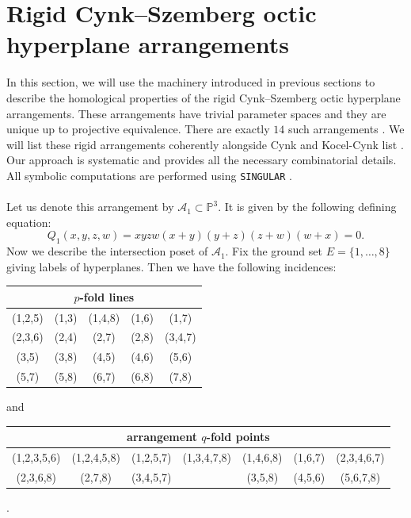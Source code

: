 \documentclass[11pt]{article}
\theoremstyle{plain}
\theoremstyle{definition}
\begin{document}
\section{Rigid Cynk--Szemberg octic hyperplane arrangements}
In this section, we will use the machinery introduced in previous sections to describe the homological properties of the rigid Cynk--Szemberg octic hyperplane arrangements. These arrangements have trivial parameter spaces and they are unique up to projective equivalence. There are exactly $14$ such arrangements \cite{Cynks}. We will list these rigid arrangements coherently alongside Cynk and Kocel-Cynk list \cite{Cynks}. Our approach is systematic and provides all the necessary combinatorial details. All symbolic computations are performed using \texttt{SINGULAR} \cite{Singular}. \\\\
\noindent
{}
\vskip 5pt
\noindent
Let us denote this arrangement by $\mathcal{A}_{1} \subset \mathbb{P}^{3}$. It is given by the following defining equation:
$$Q_{1}(x,y,z,w) = xyzw(x+y)(y+z)(z+w)(w+x)=0.$$
Now we describe the intersection poset of $\mathcal{A}_{1}$. Fix the ground set $E= \{1, \ldots , 8\}$ giving labels of hyperplanes. Then we have the following incidences:
\begin{center}
\begin{tabular}{ c c c c c }
\multicolumn{5}{c}{$p$-fold lines} \\\hline \hline
 (1,2,5) & (1,3) & (1,4,8) & (1,6) & (1,7) \\
 (2,3,6) & (2,4) &  (2,7) & (2,8) & (3,4,7) \\
 (3,5) & (3,8) & (4,5) & (4,6) & (5,6) \\
 (5,7) & (5,8) & (6,7) & (6,8) & (7,8)
\end{tabular}
\end{center}
and 
\begin{center}
\begin{tabular}{ c c c c c c c }
\multicolumn{7}{c}{arrangement $q$-fold points} \\ \hline \hline 
(1,2,3,5,6) &  (1,2,4,5,8) & (1,2,5,7) & (1,3,4,7,8) & (1,4,6,8) &  (1,6,7) &  (2,3,4,6,7) \\
(2,3,6,8) &  (2,7,8) &  (3,4,5,7) &  & (3,5,8) &  (4,5,6) &  (5,6,7,8) 
\end{tabular}.
\end{center}
\end{document}
